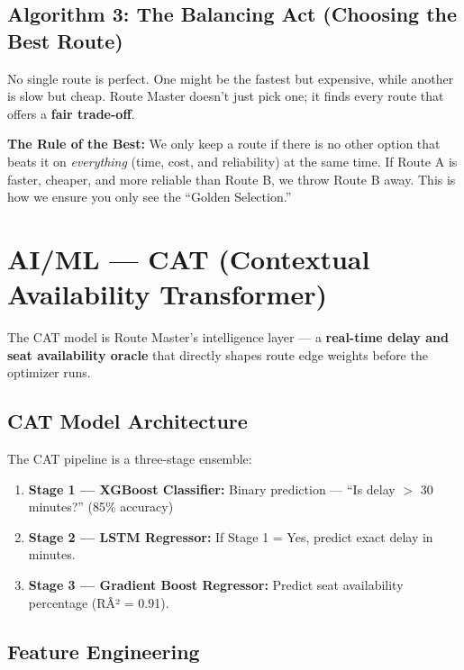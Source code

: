 \documentclass[12pt,a4paper]{report}
\begin{document}
\subsection{Algorithm 3: The Balancing Act (Choosing the Best Route)}

No single route is perfect. One might be the fastest but expensive, while another is slow but cheap. Route Master doesn't just pick one; it finds every route that offers a \textbf{fair trade-off}.

\begin{tcolorbox}[keybox]
\textbf{The Rule of the Best:} We only keep a route if there is no other option that beats it on \textit{everything} (time, cost, and reliability) at the same time. If Route A is faster, cheaper, and more reliable than Route B, we throw Route B away. This is how we ensure you only see the ``Golden Selection.''
\end{tcolorbox}

\section{AI/ML --- CAT (Contextual Availability Transformer)}

The CAT model is Route Master's intelligence layer --- a \textbf{real-time delay and seat availability oracle} that directly shapes route edge weights before the optimizer runs.

\subsection*{CAT Model Architecture}

The CAT pipeline is a three-stage ensemble:

\begin{enumerate}[leftmargin=1.5em]
  \item \textbf{Stage 1 --- XGBoost Classifier:} Binary prediction --- ``Is delay $>$ 30 minutes?'' (85\% accuracy)
  \item \textbf{Stage 2 --- LSTM Regressor:} If Stage 1 = Yes, predict exact delay in minutes.
  \item \textbf{Stage 3 --- Gradient Boost Regressor:} Predict seat availability percentage (RÂ² = 0.91).
\end{enumerate}

\subsection*{Feature Engineering}
\end{document}
